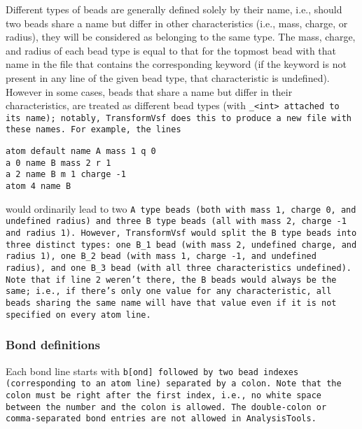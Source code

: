 Different types of beads are generally defined solely by their name, i.e.,
should two beads share a name but differ in other characteristics (i.e.,
mass, charge, or radius), they will be considered as belonging to the same
type. The mass, charge, and radius of each bead type is equal to that for
the topmost bead with that name in the \vsf file that contains the
corresponding keyword (if the keyword is not present in any line of the
given bead type, that characteristic is undefined). However in some cases,
beads that share a name but differ in their characteristics, are treated as
different bead types (with \tt{\_<int>} attached to its name); notably,
\tt{TransformVsf} does this to produce a new \vsf file with these names.
For example, the lines
%
\begin{lstlisting}
atom default name A mass 1 q 0
a 0 name B mass 2 r 1
a 2 name B m 1 charge -1
atom 4 name B
\end{lstlisting}
%
would ordinarily lead to two \tt{A} type beads (both with mass 1, charge 0,
and undefined radius) and three \tt{B} type beads (all with mass 2, charge
-1 and radius 1). However, \tt{TransformVsf} would split the \tt{B} type
beads into three distinct types: one \tt{B\_1} bead (with mass 2, undefined
charge, and radius 1), one \tt{B\_2} bead (with mass 1, charge -1, and
undefined radius), and one \tt{B\_3} bead (with all three characteristics
undefined).  Note that if line \tt{2} weren't there, the \tt{B} beads would
always be the same; i.e., if there's only one value for any characteristic,
all beads sharing the same name will have that value even if it is not
specified on every atom line.

\subsubsection{Bond definitions}
Each bond line starts with \tt{b[ond]} followed by two bead indexes
(corresponding to an atom line) separated by a colon. Note that the colon
must be right after the first index, i.e., no white space between the
number and the colon is allowed. The double-colon or comma-separated \vtf
bond entries are not allowed in \tt{AnalysisTools}.

